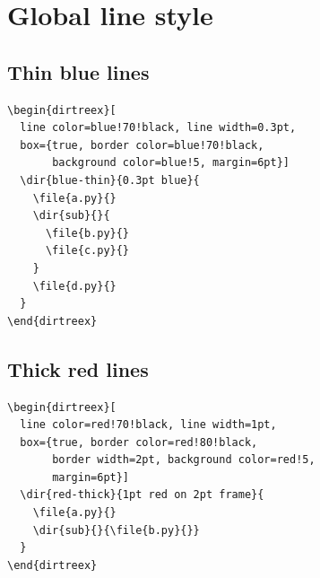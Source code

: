 \documentclass[11pt]{article}
\begin{document}
\begin{dirtreex}[
  box={margin={2pt, 30pt, 16pt, 4pt},
       border color=orange, background color=orange!8}]
\end{dirtreex}

\clearpage

\section{Global line style}

\subsection{Thin blue lines}

\begin{Verbatim}
\begin{dirtreex}[
  line color=blue!70!black, line width=0.3pt,
  box={true, border color=blue!70!black,
       background color=blue!5, margin=6pt}]
  \dir{blue-thin}{0.3pt blue}{
    \file{a.py}{}
    \dir{sub}{}{
      \file{b.py}{}
      \file{c.py}{}
    }
    \file{d.py}{}
  }
\end{dirtreex}
\end{Verbatim}

\begin{dirtreex}[
  line color=blue!70!black, line width=0.3pt,
  box={true, border color=blue!70!black,
       background color=blue!5, margin=6pt}]
\end{dirtreex}

\subsection{Thick red lines}

\begin{Verbatim}
\begin{dirtreex}[
  line color=red!70!black, line width=1pt,
  box={true, border color=red!80!black,
       border width=2pt, background color=red!5,
       margin=6pt}]
  \dir{red-thick}{1pt red on 2pt frame}{
    \file{a.py}{}
    \dir{sub}{}{\file{b.py}{}}
  }
\end{dirtreex}
\end{Verbatim}
\end{document}
